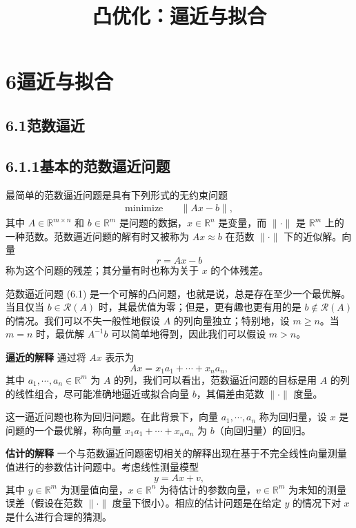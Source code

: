 \documentclass[UTF8,12pt,a4paper,fontset=fandol]{ctexart}
\title{凸优化：逼近与拟合}
\author{}
\date{}
\begin{document}
\maketitle

\section*{6\quad 逼近与拟合}

\subsection*{6.1\quad 范数逼近}

\subsection*{6.1.1\quad 基本的范数逼近问题}

最简单的范数逼近问题是具有下列形式的无约束问题
\begin{equation}
\begin{aligned}
\text{minimize}\quad & \|Ax-b\|,
\end{aligned}
\tag{6.1}
\end{equation}
其中 $A\in\mathbb{R}^{m\times n}$ 和 $b\in\mathbb{R}^m$ 是问题的数据，$x\in\mathbb{R}^n$ 是变量，而 $\|\cdot\|$ 是 $\mathbb{R}^m$ 上的一种范数。范数逼近问题的解有时又被称为 $Ax\approx b$ 在范数 $\|\cdot\|$ 下的近似解。向量
\[
r=Ax-b
\]
称为这个问题的残差；其分量有时也称为关于 $x$ 的个体残差。

范数逼近问题 (6.1) 是一个可解的凸问题，也就是说，总是存在至少一个最优解。当且仅当 $b\in\mathcal{R}(A)$ 时，其最优值为零；但是，更有趣也更有用的是 $b\notin\mathcal{R}(A)$ 的情况。我们可以不失一般性地假设 $A$ 的列向量独立；特别地，设 $m\geq n$。当 $m=n$ 时，最优解 $A^{-1}b$ 可以简单地得到，因此我们可以假设 $m>n$。

\noindent\textbf{逼近的解释}\quad
通过将 $Ax$ 表示为
\[
Ax=x_1a_1+\cdots+x_na_n,
\]
其中 $a_1,\cdots,a_n\in\mathbb{R}^m$ 为 $A$ 的列，我们可以看出，范数逼近问题的目标是用 $A$ 的列的线性组合，尽可能准确地逼近或拟合向量 $b$，其偏差由范数 $\|\cdot\|$ 度量。

这一逼近问题也称为回归问题。在此背景下，向量 $a_1,\cdots,a_n$ 称为回归量，设 $x$ 是问题的一个最优解，称向量 $x_1a_1+\cdots+x_na_n$ 为 $b$（向回归量）的回归。

\noindent\textbf{估计的解释}\quad
一个与范数逼近问题密切相关的解释出现在基于不完全线性向量测量值进行的参数估计问题中。考虑线性测量模型
\[
y=Ax+v,
\]
其中 $y\in\mathbb{R}^m$ 为测量值向量，$x\in\mathbb{R}^n$ 为待估计的参数向量，$v\in\mathbb{R}^m$ 为未知的测量误差（假设在范数 $\|\cdot\|$ 度量下很小）。相应的估计问题是在给定 $y$ 的情况下对 $x$ 是什么进行合理的猜测。
\end{document}
